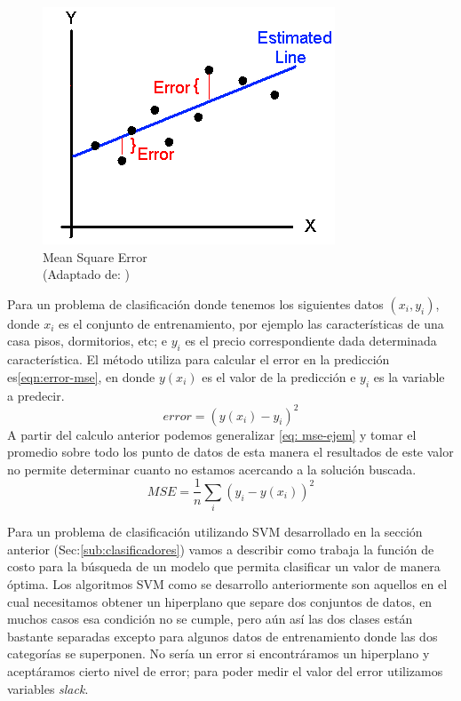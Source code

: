 \begin{figure}[H] \centering
  \includegraphics[scale=0.6,keepaspectratio=true,clip=true]{imagenes/MarcoTeorico/mse-cost.png}
  \caption{Mean Square Error \\(Adaptado de: \citep{bishop})}\label{Fig:mse}
\end{figure}

Para un problema de clasificación donde tenemos los siguientes datos $(x_i,y_i) $, donde $x_i $ es el conjunto de entrenamiento, por ejemplo las características de una casa pisos, dormitorios, etc; e $y_i$ es el precio correspondiente dada determinada característica. El método utiliza para calcular el error en la predicción es\ref{eqn:error-mse}, en donde $ y(x_i)$ es el valor de la predicción e $y_i$ es la variable a predecir.
\begin{equation}\label{eqn:error-mse}
error = (y(x_i) - y_i)^2
\end{equation} 
A partir del calculo anterior podemos generalizar \ref{eq: mse-ejem} y tomar el promedio sobre todo los punto de datos de esta manera el resultados de este valor no permite determinar cuanto no estamos acercando a la solución buscada.
\begin{equation}\label{eq: mse-ejem}
MSE =  \frac{1}{n}\sum_{i}(y_i - y(x_i))^2
\end{equation}

Para un problema de clasificación utilizando  SVM desarrollado en la sección anterior (Sec:\ref{sub:clasificadores}) vamos a describir como trabaja la función de costo para la búsqueda  de un modelo que permita clasificar un valor de manera óptima. Los algoritmos SVM como se desarrollo anteriormente son aquellos en el cual necesitamos obtener un hiperplano que separe  dos conjuntos de datos, en  muchos casos esa condición no se cumple, pero aún así las dos clases están bastante separadas excepto para algunos datos de entrenamiento  donde las dos categorías se superponen. No sería un error si encontráramos un hiperplano y aceptáramos cierto nivel de error; para poder medir el valor del error  utilizamos variables \textit{slack}.

